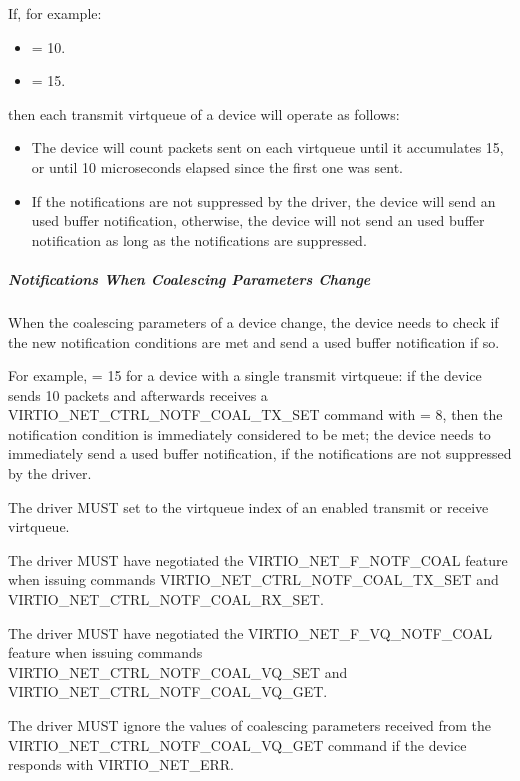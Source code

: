 If, for example:
\begin{itemize}
\item {} = 10.
\item {} = 15.
\end{itemize}
then each transmit virtqueue of a device will operate as follows:
\begin{itemize}
\item The device will count packets sent on each virtqueue until it accumulates 15, or until 10 microseconds elapsed since the first one was sent.
\item If the notifications are not suppressed by the driver, the device will send an used buffer notification, otherwise, the device will not send an used buffer notification as long as the notifications are suppressed.
\end{itemize}

\subparagraph{Notifications When Coalescing Parameters Change}\label{sec:Device Types / Network Device / Device Operation / Control Virtqueue / Notifications Coalescing / Notifications When Coalescing Parameters Change}

When the coalescing parameters of a device change, the device needs to check if the new notification conditions are met and send a used buffer notification if so.

For example,  = 15 for a device with a single transmit virtqueue: if the device sends 10 packets and afterwards receives a
VIRTIO_NET_CTRL_NOTF_COAL_TX_SET command with  = 8, then the notification condition is immediately considered to be met;
the device needs to immediately send a used buffer notification, if the notifications are not suppressed by the driver.


The driver MUST set  to the virtqueue index of an enabled transmit or receive virtqueue.

The driver MUST have negotiated the VIRTIO_NET_F_NOTF_COAL feature when issuing commands VIRTIO_NET_CTRL_NOTF_COAL_TX_SET and VIRTIO_NET_CTRL_NOTF_COAL_RX_SET.

The driver MUST have negotiated the VIRTIO_NET_F_VQ_NOTF_COAL feature when issuing commands VIRTIO_NET_CTRL_NOTF_COAL_VQ_SET and VIRTIO_NET_CTRL_NOTF_COAL_VQ_GET.

The driver MUST ignore the values of coalescing parameters received from the VIRTIO_NET_CTRL_NOTF_COAL_VQ_GET command if the device responds with VIRTIO_NET_ERR.

